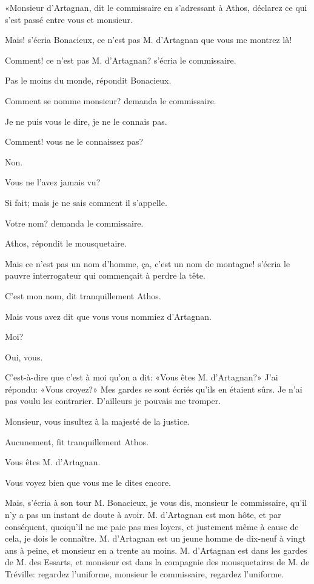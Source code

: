 «Monsieur d'Artagnan, dit le commissaire en s'adressant à Athos, déclarez ce qui s'est passé entre vous et monsieur. 

\speak  Mais! s'écria Bonacieux, ce n'est pas M. d'Artagnan que vous me montrez là! 

\speak  Comment! ce n'est pas M. d'Artagnan? s'écria le commissaire. 

\speak  Pas le moins du monde, répondit Bonacieux. 

\speak  Comment se nomme monsieur? demanda le commissaire. 

\speak  Je ne puis vous le dire, je ne le connais pas. 

\speak  Comment! vous ne le connaissez pas? 

\speak  Non. 

\speak  Vous ne l'avez jamais vu? 

\speak  Si fait; mais je ne sais comment il s'appelle. 

\speak  Votre nom? demanda le commissaire. 

\speak  Athos, répondit le mousquetaire. 

\speak  Mais ce n'est pas un nom d'homme, ça, c'est un nom de montagne! s'écria le pauvre interrogateur qui commençait à perdre la tête. 

\speak  C'est mon nom, dit tranquillement Athos. 

\speak  Mais vous avez dit que vous vous nommiez d'Artagnan. 

\speak  Moi? 

\speak  Oui, vous. 

\speak  C'est-à-dire que c'est à moi qu'on a dit: «Vous êtes M. d'Artagnan?» J'ai répondu: «Vous croyez?» Mes gardes se sont écriés qu'ils en étaient sûrs. Je n'ai pas voulu les contrarier. D'ailleurs je pouvais me tromper. 

\speak  Monsieur, vous insultez à la majesté de la justice. 

\speak  Aucunement, fit tranquillement Athos. 

\speak  Vous êtes M. d'Artagnan. 

\speak  Vous voyez bien que vous me le dites encore. 

\speak  Mais, s'écria à son tour M. Bonacieux, je vous dis, monsieur le commissaire, qu'il n'y a pas un instant de doute à avoir. M. d'Artagnan est mon hôte, et par conséquent, quoiqu'il ne me paie pas mes loyers, et justement même à cause de cela, je dois le connaître. M. d'Artagnan est un jeune homme de dix-neuf à vingt ans à peine, et monsieur en a trente au moins. M. d'Artagnan est dans les gardes de M. des Essarts, et monsieur est dans la compagnie des mousquetaires de M. de Tréville: regardez l'uniforme, monsieur le commissaire, regardez l'uniforme. 

